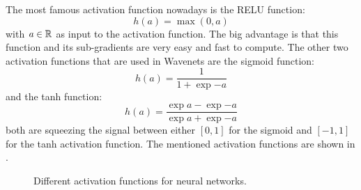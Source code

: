 The most famous activation function nowadays is the RELU function:
\begin{equation}\label{eq:nn_theory_relu}
  h(a) = \max{(0, a)}
\end{equation}
with $a \in \mathbb{R}$ as input to the activation function.
The big advantage is that this function and its sub-gradients are very easy and fast to compute.
The other two activation functions that are used in Wavenets are the sigmoid function:
\begin{equation}\label{eq:nn_theory_sigmoid}
  h(a) = \frac{1}{1 + \exp{-a}}
\end{equation}
and the tanh function:
\begin{equation}\label{eq:nn_theory_tanh}
  h(a) = \frac{\exp{a} - \exp{-a}}{\exp{a} + \exp{-a}}
\end{equation}
both are squeezing the signal between either $[0, 1]$ for the sigmoid and $[-1, 1]$ for the tanh activation function.
The mentioned activation functions are shown in .
\begin{figure}[!ht]
  \centering
  \caption{Different activation functions for neural networks.}
  \label{fig:nn_theory_activation}
\end{figure}
\FloatBarrier
\noindent


